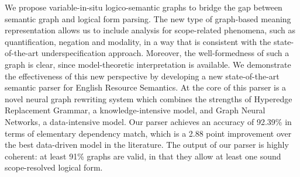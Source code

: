 We propose variable-in-situ logico-semantic graphs to bridge the gap between semantic graph and logical form parsing. The new type of graph-based meaning representation allows us to include analysis for scope-related phenomena, such as quantification, negation and modality, in a way that is consistent with the state-of-the-art underspecification approach. Moreover, the well-formedness of such a graph is clear, since model-theoretic interpretation is available. We demonstrate the effectiveness of this new perspective by developing a new state-of-the-art semantic parser for English Resource Semantics.  At the core of this parser is a novel neural graph rewriting system which combines the strengths of Hyperedge Replacement Grammar, a knowledge-intensive model, and Graph Neural Networks, a data-intensive model. Our parser achieves an accuracy of 92.39\% in terms of elementary dependency match, which is a 2.88 point improvement over the best data-driven model in the literature. The output of our parser is highly coherent: at least 91\% graphs are valid, in that they allow at least one sound scope-resolved logical form.
